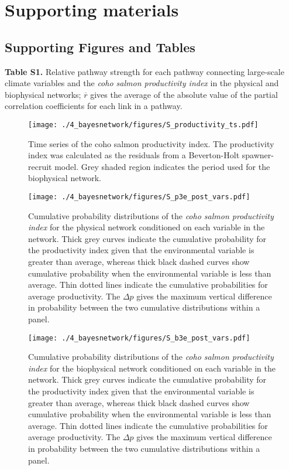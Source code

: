 \newpage
\section{Supporting materials}

\subsection{Supporting Figures and Tables}

\textbf{Table S1.} Relative pathway strength for each pathway connecting
large-scale climate variables and the \emph{coho salmon productivity
index} in the physical and biophysical networks; \(\overline{r}\) gives
the average of the absolute value of the partial correlation
coefficients for each link in a pathway.



\begin{figure}[htbp]
  \centering \texttt{[image: ./4\_bayesnetwork/figures/S\_productivity\_ts.pdf]}
  \caption{Time series of the coho salmon productivity index. The productivity
    index was calculated as the residuals from a Beverton-Holt spawner-recruit
    model. Grey shaded region indicates the period used for the biophysical
    network.}
  \label{fig:bn:s1}
\end{figure}

\begin{figure}[htbp]
  \centering \texttt{[image: ./4\_bayesnetwork/figures/S\_p3e\_post\_vars.pdf]}
  \caption{Cumulative probability distributions of the \emph{coho salmon
    productivity index} for the physical network conditioned on each variable in
    the network. Thick grey curves indicate the cumulative probability for the
    productivity index given that the environmental variable is greater than
    average, whereas thick black dashed curves show cumulative probability when
    the environmental variable is less than average. Thin dotted lines indicate
    the cumulative probabilities for average productivity. The \(\Delta p\)
    gives the maximum vertical difference in probability between the two
    cumulative distributions within a panel.}
  \label{fig:bn:s2}
\end{figure}

\begin{figure}[htbp]
  \centering \texttt{[image: ./4\_bayesnetwork/figures/S\_b3e\_post\_vars.pdf]}
  \caption{Cumulative probability distributions of the \emph{coho salmon
    productivity index} for the biophysical network conditioned on each variable
    in the network. Thick grey curves indicate the cumulative probability for
    the productivity index given that the environmental variable is greater than
    average, whereas thick black dashed curves show cumulative probability when
    the environmental variable is less than average. Thin dotted lines indicate
    the cumulative probabilities for average productivity. The \(\Delta p\)
    gives the maximum vertical difference in probability between the two
    cumulative distributions within a panel.}
  \label{fig:bn:s3}
\end{figure}

